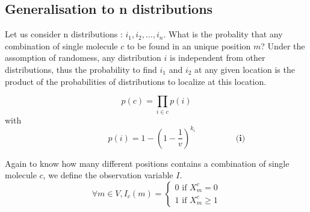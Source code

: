 \documentclass{article}
\begin{document}
\subsection{Generalisation to n distributions}

Let us consider n distributions : $i_1, i_2, ..., i_n$. What is the probality that any combination of single molecule $c$ to be found in an unique position $m$?
Under the assomption of randomess, any distribution $i$ is independent from other distributions, thus the probability to find $i_1$ and $i_2$ at any given
location is the product of the probabilities of distributions to localize at this location.

\[
p(c) = \prod_{i \in c}p(i)
\]
with 
\[
\hspace{2cm} p(i) = 1-(1-\frac{1}{v})^{k_i} \hspace{2cm} \textbf{(i)}
\]

Again to know how many different positions contains a combination of single molecule $c$, we define the observation variable $I$.
\[
\forall m \in V, I_c(m) = \begin{cases}
    0 \text{ if } X^c_m = 0 \\
    1 \text{ if } X^c_m \geq 1
\end{cases}
\]



\end{document}
